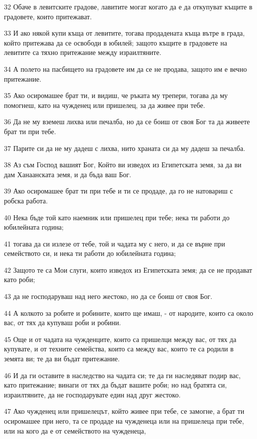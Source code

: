 \par 32 Обаче в левитските градове, лавитите могат когато да е да откупуват къщите в градовете, които притежават.
\par 33 И ако някой купи къща от левитите, тогава продадената къща вътре в града, който притежава да се освободи в юбилей; защото къщите в градовете на левитите са тяхно притежание между израилтяните.
\par 34 А полето на пасбището на градовете им да се не продава, защото им е вечно притежание.
\par 35 Ако осиромашее брат ти, и видиш, че ръката му трепери, тогава да му помогнеш, като на чужденец или пришелец, за да живее при тебе.
\par 36 Да не му вземеш лихва или печалба, но да се боиш от своя Бог та да живеете брат ти при тебе.
\par 37 Парите си да не му дадеш с лихва, нито храната си да му дадеш за печалба.
\par 38 Аз съм Господ вашият Бог, Който ви изведох из Египетската земя, за да ви дам Ханаанската земя, и да бъда ваш Бог.
\par 39 Ако осиромашее брат ти при тебе и ти се продаде, да го не натовариш с робска работа.
\par 40 Нека бъде той като наемник или пришелец при тебе; нека ти работи до юбилейната година;
\par 41 тогава да си излезе от тебе, той и чадата му с него, и да се върне при семейството си, и нека ти работи до юбилейната година;
\par 42 Защото те са Мои слуги, които изведох из Египетската земя; да се не продават като роби;
\par 43 да не господаруваш над него жестоко, но да се боиш от своя Бог.
\par 44 А колкото за робите и робините, които ще имаш, - от народите, които са около вас, от тях да купуваш роби и робини.
\par 45 Още и от чадата на чужденците, които са пришелци между вас, от тях да купувате, и от техните семейства, които са между вас, които те са родили в земята ви; те да ви бъдат притежание.
\par 46 И да ги оставите в наследство на чадата си; те да ги наследяват подир вас, като притежание; винаги от тях да бъдат вашите роби; но над братята си, израилтяните, да не господарувате един над друг жестоко.
\par 47 Ако чужденец или пришелецът, който живее при тебе, се замогне, а брат ти осиромашее при него, та се продаде на чужденеца или на пришелеца при тебе, или на кого да е от семейството на чужденеца,
